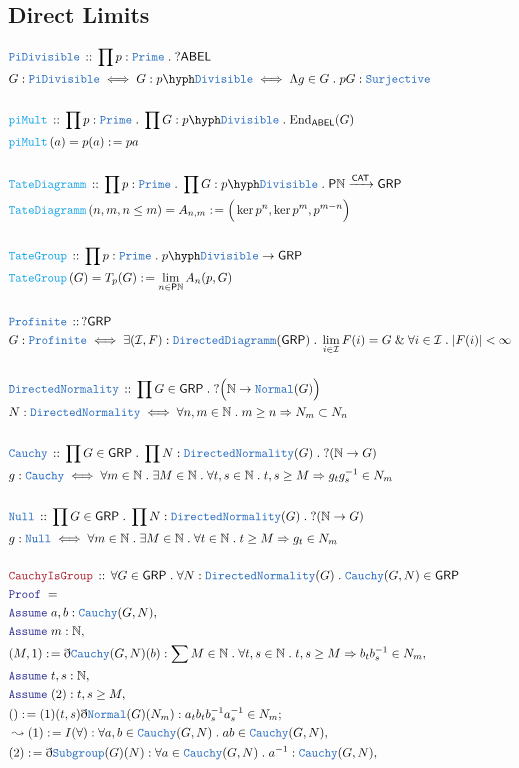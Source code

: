 \documentclass[12pt]{scrartcl}
\newcommand{\TYPE}[1]{\textcolor{NavyBlue}{\mathtt{#1}}}
\newcommand{\FUNC}[1]{\textcolor{Cerulean}{\mathtt{#1}}}
\newcommand{\LOGIC}[1]{\textcolor{Blue}{\mathtt{#1}}}
\newcommand{\THM}[1]{\textcolor{Maroon}{\mathtt{#1}}}
\renewcommand{\.}{\; . \;}
\newcommand{\de}{: \kern 0.1pc =}
\newcommand{\Act}[1]{\left( #1 \right)}
\newcommand{\Theorem}[2]{& \THM{#1} \, :: \, #2 \\ & \Proof = \\ }
\newcommand{\DeclareType}[2]{& \TYPE{#1} \, :: \, #2 \\}
\newcommand{\DefineType}[3]{& #1 : \TYPE{#2} \iff #3 \\}
\newcommand{\DefineNamedType}[4]{& #1 : \TYPE{#2} \iff #3 \iff #4 \\}
\newcommand{\DeclareFunc}[2]{& \FUNC{#1} \, :: \, #2 \\}
\newcommand{\DefineNamedFunc}[4]{&  \FUNC{#1}\Act{#2} = #3 \de #4 \\}
\newcommand{\Page}[1]{ \begin{align*} #1 \end{align*}   }
\newcommand{ \bd }{ \ByDef }
\renewcommand{\And}{\; \& \;}
\newcommand{\Nat}{\mathbb{N} }
\newcommand{\End}{\mathrm{End}}
\newcommand{\Say}[3]{& #1 \de #2 : #3, \\}
\newcommand{\Conclude}[3]{& #1 \de #2 : #3; \\}
\newcommand{\Derive}[3]{& \leadsto #1 \de #2 : #3, \\}
\newcommand{\Assume}[2]{& \LOGIC{Assume} \; #1 : #2, \\}
\newcommand{\ByDef}{\eth}
\newcommand{\Proof}{\LOGIC{Proof} \; }
\newcommand{\Arrow}[1]{\xrightarrow{#1}}
\newcommand{\I}{\mathcal{I}}
\newcommand{\CAT}{\mathsf{CAT}}
\newcommand{\DN}{\TYPE{DirectedNormality}}
\newcommand{\GRP}{\mathsf{GRP}}
\newcommand{\ABEL}{\mathsf{ABEL}}
\begin{document}
\subsection{Direct Limits}
\Page{
	\DeclareType{PiDivisible}{ \prod p : \TYPE{Prime} \. ?\ABEL}
	\DefineNamedType{G}{PiDivisible}{G : p\hyph\TYPE{Divisible}}{\Lambda g \in G \. pG : \TYPE{Surjective}}
	\\
	\DeclareFunc{piMult}{\prod p : \TYPE{Prime} \. \prod G : p\hyph \TYPE{Divisible} \. \End_\ABEL(G) }
	\DefineNamedFunc{piMult}{a}{p(a)}{pa}
	\\
	\DeclareFunc{TateDiagramm}{ \prod p : \TYPE{Prime} \. \prod G : p\hyph\TYPE{Divisible} \. \mathsf{P}\Nat \Arrow{\CAT} \GRP }
	\DefineNamedFunc{TateDiagramm}{ n, m, n \le m  }{A_{n,m}}{\Big(\ker p^n,\ker p^m,p^{m-n}\Big)}
	\\
	\DeclareFunc{TateGroup}{\prod p : \TYPE{Prime} \.  p\hyph\TYPE{Divisible} \to \GRP}
	\DefineNamedFunc{TateGroup}{G}{T_p(G)}{\lim_{n \in \mathsf{P}\Nat} A_n(p,G)}
	\\
	\DeclareType{Profinite}{ ?\GRP }
	\DefineType{G}{Profinite}{ \exists (\I,F) : \TYPE{DirectedDiagramm}(\GRP) \. \lim_{i \in \I} F(i) = G \And \forall i \in \I \. |F(i)| < \infty} 
	\\
	\DeclareType{DirectedNormality}{\prod G \in \GRP \. ?\Big(\Nat \to \TYPE{Normal}(G)\Big) }
	\DefineType{N}{DirectedNormality}{ \forall n,m \in \Nat \. m \ge n \Rightarrow N_m \subset N_n}
	\\
	\DeclareType{Cauchy}{\prod G \in \GRP \. \prod N : \TYPE{DirectedNormality}(G) \. ?(\Nat \to G)  }
	\DefineType{g}{Cauchy}{ \forall m \in \Nat \. \exists M \in \Nat \. \forall t,s \in \Nat \. t,s \ge M \Rightarrow g_t g^{-1}_s \in N_m  }
	\\
	\DeclareType{Null}{\prod G \in \GRP \. \prod N : \TYPE{DirectedNormality}(G) \. ?(\Nat \to G)}
	\DefineType{g}{Null}{\forall m \in \Nat \. \exists M \in \Nat \. \forall t \in \Nat \. t \ge M \Rightarrow g_t \in N_m}
	\\
	\Theorem{CauchyIsGroup}{\forall G \in \GRP \. \forall N : \DN(G) \. \TYPE{Cauchy}(G,N) \in \GRP}
	\Assume{a,b}{\TYPE{Cauchy}(G,N)}
	\Assume{m}{\Nat}
	\Say{(M,1)}{\bd \TYPE{Cauchy}(G,N)(b)}{\sum M \in \Nat \. \forall t,s \in \Nat \. t,s \ge M \Rightarrow b_t b_s^{-1} \in N_m }
	\Assume{t,s}{\Nat}
	\Assume{(2)}{ t,s \ge M}
	\Conclude{()}{(1)(t,s) \bd \TYPE{Normal}(G)(N_m)}{ a_t b_t b^{-1}_s a^{-1}_s \in N_m  }
	\Derive{(1)}{I(\forall)}{\forall a,b \in \TYPE{Cauchy}(G,N) \. ab \in \TYPE{Cauchy}(G,N)}
	\Say{(2)}{\bd \TYPE{Subgroup}(G)(N)}{ \forall a \in \TYPE{Cauchy}(G,N) \. a^{-1} : \TYPE{Cauchy}(G,N)}
}
\end{document}
